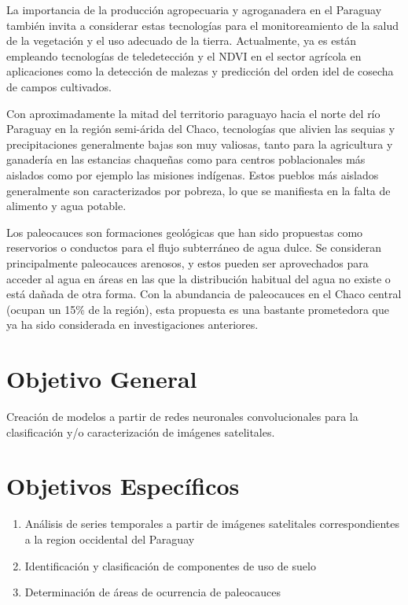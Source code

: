 \documentclass[a4paper, 11pt]{article}
\begin{document}
La importancia de la producción agropecuaria y agroganadera en el Paraguay también invita a considerar estas tecnologías para el monitoreamiento de la salud de la vegetación y el uso adecuado de la tierra. Actualmente, ya es están empleando tecnologías de teledetección y el NDVI en el sector agrícola en aplicaciones como la detección de malezas y predicción del orden idel de cosecha de campos cultivados. \autocite{onesoil-agricultura-paraguay}

Con aproximadamente la mitad del territorio paraguayo hacia el norte del río Paraguay en la región semi-árida del Chaco, tecnologías que alivien las sequias y precipitaciones generalmente bajas son muy valiosas, tanto para la agricultura y ganadería en las estancias chaqueñas como para centros poblacionales más aislados como por ejemplo las misiones indígenas. Estos pueblos más aislados generalmente son caracterizados por pobreza, lo que se manifiesta en la falta de alimento y agua potable.

Los paleocauces son formaciones geológicas que han sido propuestas como reservorios o conductos para el flujo subterráneo de agua dulce. Se consideran principalmente paleocauces arenosos, y estos pueden ser aprovechados para acceder al agua en áreas en las que la distribución habitual del agua no existe o está dañada de otra forma. \autocite{wikipedia-paleochannel} Con la abundancia de paleocauces en el Chaco central (ocupan un 15\% de la región), esta propuesta es una bastante prometedora que ya ha sido considerada en investigaciones anteriores. \autocite{conacyt-sistemas-captacion-agua}

\section*{Objetivo General}
Creación de modelos a partir de redes neuronales convolucionales para la clasificación y/o caracterización de imágenes satelitales.

\section*{Objetivos Específicos}
\begin{enumerate}
    \item Análisis de series temporales a partir de imágenes satelitales correspondientes a la region occidental del Paraguay
    \item Identificación y clasificación de componentes de uso de suelo
    \item Determinación de áreas de ocurrencia de paleocauces
\end{enumerate}
\end{document}
